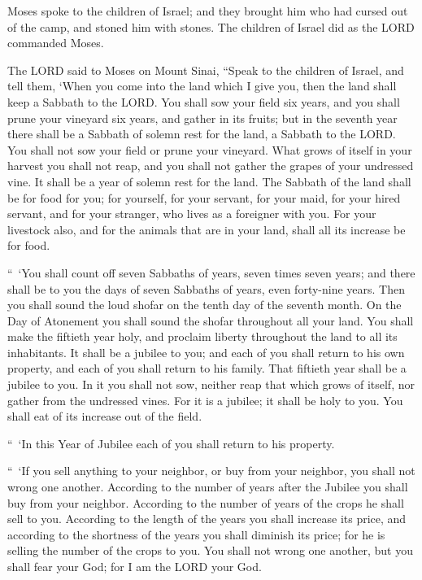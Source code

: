 \myverse{}Moses spoke to the children of Israel; and they brought him
who had cursed out of the camp, and stoned him with stones. The children of Israel did as the LORD commanded
Moses.


\mychapter{} \myverse*{}The LORD said to Moses on Mount Sinai,
\myverse{}“Speak to the children of Israel, and tell them, ‘When you come into the land
which I give you, then the land shall keep a Sabbath to the LORD.
\myverse{}You shall sow your field six years, and you shall prune your vineyard six years,
and gather in its fruits;
\myverse{}but in the seventh year there shall be a Sabbath of solemn rest for the land,
a Sabbath to the LORD. You shall not sow your field or prune your vineyard.
\myverse{}What grows of itself in your harvest you shall not reap, and you shall not
gather the grapes of your undressed vine. It shall be a year of solemn rest for the land.
\myverse{}The Sabbath of the land shall be for food for you; for yourself, for your servant,
for your maid, for your hired servant, and for your stranger, who lives as a foreigner with you.
\myverse{}For your livestock also, and for the animals that are in your land, shall all
its increase be for food.


\myverse{}“ ‘You shall count off seven Sabbaths of years, seven times seven
years; and there shall be to you the days of seven Sabbaths of years, even forty-nine years.
\myverse{}Then you shall sound the loud shofar on the tenth day of the seventh month.
On the Day of Atonement you shall sound the shofar throughout all your land.
\myverse{}You shall make the fiftieth year holy, and proclaim liberty throughout the
land to all its inhabitants. It shall be a jubilee to you; and each of you shall return to his own property,
and each of you shall return to his family.
\myverse{}That fiftieth year shall be a jubilee to you. In it you shall not sow, neither
reap that which grows of itself, nor gather from the undressed vines.
\myverse{}For it is a jubilee; it shall be holy to you. You shall eat of its increase
out of the field.


\myverse{}“ ‘In this Year of Jubilee each of you shall return to his property.


\myverse{}“ ‘If you sell anything to your neighbor, or buy from your neighbor,
you shall not wrong one another.
\myverse{}According to the number of years after the Jubilee you shall buy from your
neighbor. According to the number of years of the crops he shall sell to you.
\myverse{}According to the length of the years you shall increase its price, and according
to the shortness of the years you shall diminish its price; for he is selling the number of the crops
to you.
\myverse{}You shall not wrong one another, but you shall fear your God; for I am the
LORD your God.


